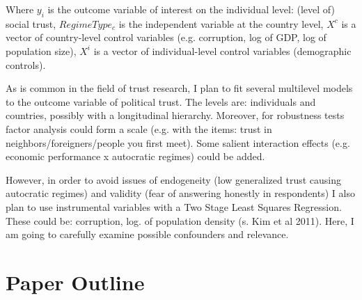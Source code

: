 Where $y_i$ is the outcome variable of interest on the individual level: (level of) social trust, $RegimeType_c$ is the independent variable at the country level, $X^c$ is a vector of country-level control variables (e.g. corruption, log of GDP, log of population size), $X^i$ is a vector of individual-level control variables (demographic controls).

As is common in the field of trust research, I plan to fit several multilevel models to the outcome variable of political trust. The levels are: individuals and countries, possibly with a longitudinal hierarchy. Moreover, for robustness tests factor analysis could form a scale (e.g. with the items: trust in neighbors/foreigners/people you first meet). Some salient interaction effects (e.g. economic performance x autocratic regimes) could be added.

However, in order to avoid issues of endogeneity (low generalized trust causing autocratic regimes) and validity (fear of answering honestly in respondents) I also plan to use instrumental variables with a Two Stage Least Squares Regression. These could be: corruption, log. of population density (s. Kim et al 2011)\nocite{kim2011}. Here, I am going to carefully examine possible confounders and relevance. 


\section{Paper Outline}



